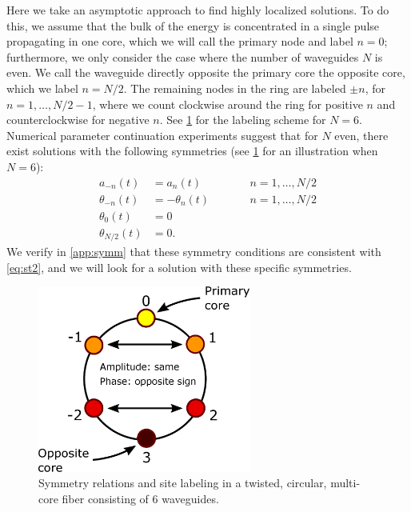 \documentclass[11pt,reqno]{amsart}
\begin{document}
Here we take an asymptotic approach to find highly localized solutions. To do this, we assume that the bulk of the energy is concentrated in a single pulse propagating in one core, which we will call the primary node and label $n=0$; furthermore, we only consider the case where  the number of waveguides $N$ is even. We call the waveguide directly opposite the primary core the opposite core, which we label $n=N/2$. The remaining nodes in the ring are labeled $\pm n$, for $n = 1, \dots, N/2-1$, where we count clockwise around the ring for positive $n$ and counterclockwise for negative $n$. See \cref{fig:symm6} for the labeling scheme for $N=6$. Numerical parameter continuation experiments suggest that for $N$ even, there exist solutions with the following symmetries (see \cref{fig:symm6} for an illustration when $N=6$):
\begin{equation}\label{eq:symm}
\begin{aligned}
a_{-n}(t) &= a_{n}(t) && \qquad n = 1, \dots, N/2 \\
\theta_{-n}(t) &= -\theta_{n}(t) && \qquad n = 1, \dots, N/2 \\
\theta_0(t) &= 0 \\
\theta_{N/2}(t) &= 0.
\end{aligned}
\end{equation} 
We verify in \cref{app:symm} that these symmetry conditions are consistent with \cref{eq:st2}, and we will look for a solution with these specific symmetries. 

\begin{figure}
\begin{center}
\includegraphics[width=7cm]{symm6}
\end{center}
\caption{Symmetry relations and site labeling in a twisted, circular, multi-core fiber consisting of 6 waveguides.}
\label{fig:symm6}
\end{figure}
\end{document}
